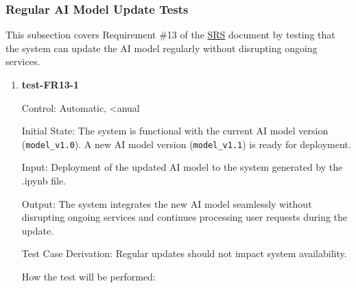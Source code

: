 \documentclass[12pt, titlepage]{article}
\begin{document}
\subsubsection{Regular AI Model Update Tests}

This subsection covers Requirement \#13 of the \href{https://github.com/RezaJodeiri/CXR-Capstone/blob/main/docs/SRS/SRS.pdf}{SRS} \citep{SRS}
document by testing that the system can update the AI model regularly without disrupting ongoing services.

\begin{enumerate}

\item \textbf{test-FR13-1} \label{test-FR13-1}

Control: Automatic, <anual

Initial State: The system is functional with the current AI model version (\texttt{model\_v1.0}). A new AI model version (\texttt{model\_v1.1}) is ready for deployment.

Input: Deployment of the updated AI model to the system generated by the .ipynb file.

Output: The system integrates the new AI model seamlessly without disrupting ongoing services and continues processing user requests during the update.

Test Case Derivation: Regular updates should not impact system availability.

How the test will be performed:


\end{enumerate}
\end{document}
